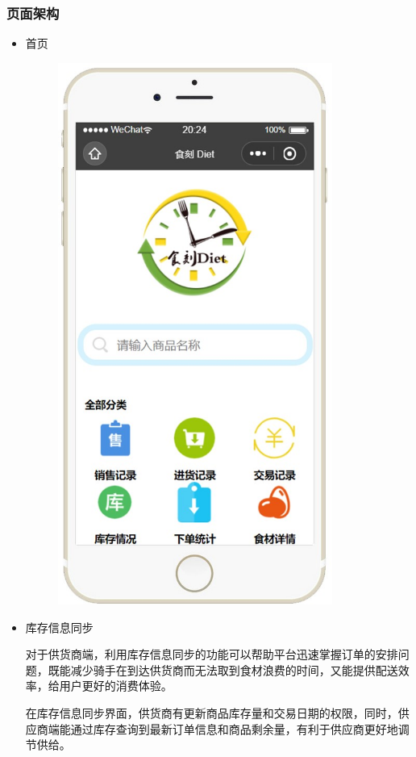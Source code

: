 \documentclass[UTF8,12pt]{ctexart}
\numberwithin{figure}{section}%
\begin{document}
\begin{spacing}{2}
\subsubsection{页面架构}

\begin{itemize}
	
	\item 首页
	
	\begin{figure}[!htb]
		\centering
		\includegraphics[width=9cm]{fig/!10}
	\end{figure}
	
	\item 库存信息同步
	
	对于供货商端，利用库存信息同步的功能可以帮助平台迅速掌握订单的安排问题，既能减少骑手在到达供货商而无法取到食材浪费的时间，又能提供配送效率，给用户更好的消费体验。
	
	在库存信息同步界面，供货商有更新商品库存量和交易日期的权限，同时，供应商端能通过库存查询到最新订单信息和商品剩余量，有利于供应商更好地调节供给。
	

\end{itemize}
\end{spacing}
\end{document}
